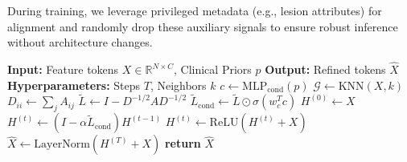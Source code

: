 \documentclass{article}
\begin{document}
During training, we leverage privileged metadata (e.g., lesion attributes) for alignment and randomly drop these auxiliary signals to ensure robust inference without architecture changes.

\begin{algorithm}[t]
\caption{Conditional Graph Diffusion (CoGD)}
\label{alg:cogd}
\begin{algorithmic}[1]
\STATE \textbf{Input:} Feature tokens $X \in \mathbb{R}^{N \times C}$, Clinical Priors $p$
\STATE \textbf{Output:} Refined tokens $\hat{X}$
\STATE \textbf{Hyperparameters:} Steps $T$, Neighbors $k$
\STATE $c \leftarrow \text{MLP}_{\text{cond}}(p)$ 
\STATE $\mathcal{G} \leftarrow \text{KNN}(X, k)$ 
\STATE $D_{ii} \leftarrow \sum_j A_{ij}$ 
\STATE $\tilde{L} \leftarrow I - D^{-1/2} A D^{-1/2}$ 
\STATE $\tilde{L}_{\text{cond}} \leftarrow \tilde{L} \odot \sigma(w_c^T c)$ 
\STATE $H^{(0)} \leftarrow X$
    \STATE $H^{(t)} \leftarrow (I - \alpha \tilde{L}_{\text{cond}}) H^{(t-1)}$ 
    \STATE $H^{(t)} \leftarrow \text{ReLU}(H^{(t)} + X)$ 
\ENDFOR
\STATE $\hat{X} \leftarrow \text{LayerNorm}(H^{(T)} + X)$
\STATE \textbf{return} $\hat{X}$
\end{algorithmic}
\end{algorithm}
\end{document}
